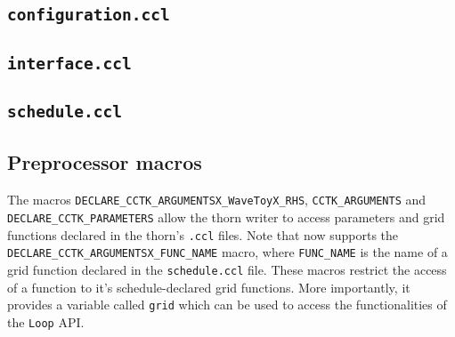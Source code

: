 \subsection{\texttt{configuration.ccl}}


\subsection{\texttt{interface.ccl}}


\subsection{\texttt{schedule.ccl}}


\subsection{Preprocessor macros}


The macros \texttt{DECLARE\_CCTK\_ARGUMENTSX\_WaveToyX\_RHS}, \texttt{CCTK\_ARGUMENTS} and \texttt{DECLARE\_CCTK\_PARAMETERS} allow the thorn writer to access parameters and grid functions declared in the thorn's \texttt{.ccl} files. Note that \Cactus\space now supports the \texttt{DECLARE\_CCTK\_ARGUMENTSX\_FUNC\_NAME} macro, where \texttt{FUNC\_NAME} is the name of a grid function declared in the \texttt{schedule.ccl} file. These macros restrict the access of a function to it's schedule-declared grid functions. More importantly, it provides a variable called \texttt{grid} which can be used to access the functionalities of the \texttt{Loop} API.